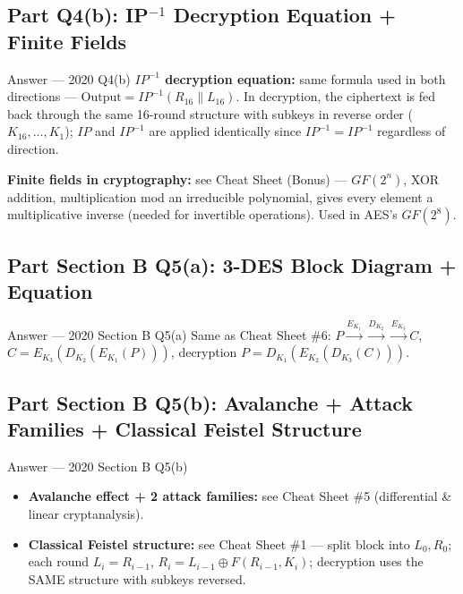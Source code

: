 \documentclass[12pt,a4paper]{article}
\begin{document}
\subsection{Part Q4(b): IP$^{-1}$ Decryption Equation + Finite Fields}
\begin{solbox}{Answer --- 2020 Q4(b)}
\textbf{$IP^{-1}$ decryption equation:} same formula used in both directions --- $\text{Output} = IP^{-1}(R_{16}\|L_{16})$. In decryption, the ciphertext is fed back through the same 16-round structure with subkeys in reverse order ($K_{16},\dots,K_1$); $IP$ and $IP^{-1}$ are applied identically since $IP^{-1}=IP^{-1}$ regardless of direction.

\textbf{Finite fields in cryptography:} see Cheat Sheet (Bonus) --- $GF(2^n)$, XOR addition, multiplication mod an irreducible polynomial, gives every element a multiplicative inverse (needed for invertible operations). Used in AES's $GF(2^8)$.
\end{solbox}

\subsection{Part Section B Q5(a): 3-DES Block Diagram + Equation}
\begin{solbox}{Answer --- 2020 Section B Q5(a)}
Same as Cheat Sheet \#6: $P \xrightarrow{E_{K_1}} \xrightarrow{D_{K_2}} \xrightarrow{E_{K_3}} C$, $C = E_{K_3}(D_{K_2}(E_{K_1}(P)))$, decryption $P = D_{K_1}(E_{K_2}(D_{K_3}(C)))$.
\end{solbox}

\subsection{Part Section B Q5(b): Avalanche + Attack Families + Classical Feistel Structure}
\begin{solbox}{Answer --- 2020 Section B Q5(b)}
\begin{itemize}[noitemsep]
  \item \textbf{Avalanche effect + 2 attack families:} see Cheat Sheet \#5 (differential \& linear cryptanalysis).
  \item \textbf{Classical Feistel structure:} see Cheat Sheet \#1 --- split block into $L_0,R_0$; each round $L_i=R_{i-1}$, $R_i=L_{i-1}\oplus F(R_{i-1},K_i)$; decryption uses the SAME structure with subkeys reversed.
\end{itemize}
\end{solbox}

\newpage
\end{document}
